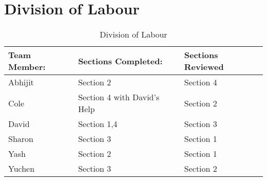 \documentclass[12pt]{article}
\begin{document}
\section{Division of Labour}
\label{sec:division_of_labour}
\begin{table}[ht]
	\centering
	\begin{tabular}{|p{2cm}|p{5cm}|p{5cm}|}
		\hline
		\textbf{Team Member:} & \textbf{Sections Completed:} & \textbf{Sections Reviewed}\\
		\hline
		Abhijit & Section 2 & Section 4\\
		\hline
		Cole & Section 4 with David's Help & Section 2\\
		\hline
		David & Section 1,4 & Section 3\\
		\hline
		Sharon & Section 3 & Section 1\\
		\hline
		Yash & Section 2 & Section 1\\
		\hline
		Yuchen & Section 3 & Section 2\\
		\hline
	\end{tabular}
	\caption{Division of Labour}
	\label{table:1}
\end{table}
\end{document}
